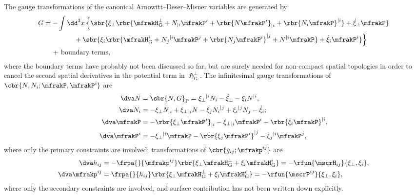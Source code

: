 \documentclass[a4paper,11pt]{article}
\begin{document}
The gauge transformations of the canonical Arnowitt--Deser--Misner variables are 
generated by \cite{Castellani1982} 
\begin{align}
G &= -\int\dd^3 x\,\Big\{ \sbr{
	\xi_\perp \rbr{
		\mfrakH_\text{G}^\perp + N_{|i} \mfrakP^i + \rbr{N\mfrakP^i}_{|i} + 
			\rbr{N_i \mfrakP}^{|i}} +
	\dot{\xi}_\perp \mfrakP}
\nonumber \\
&\qquad\qquad\ \,+ \sbr{
	\xi_i \rbr{
		\mfrakH_\text{G}^i + N_j{}^{|i} \mfrakP^j + \rbr{N_j \mfrakP^i}^{|j} + 
N^{|i} 
\mfrakP} +
	\dot{\xi}_i \mfrakP^i} \Big\}
\nonumber \\
&\quad\,
+\,\text{boundary terms},
\end{align}
where the boundary terms have probably not been discussed so far, but are 
surely needed for non-compact spatial topologies in order to cancel the second 
spatial derivatives in the potential term in $\mfrakH_\text{G}^\perp$. The 
infinitesimal 
gauge transformations of $\cbr{N, N_i; \mfrakP, \mfrakP^i}$ are 
\cite{Kiriushcheva2008}
\begin{align}
\dva N &= \sbr{N, G}_\text{P} = 
\xi_\perp{}^{|i} N_i - \dot{\xi}_\perp - \xi_i N^{|i},
\label{eq:gauge-Np} \\
\dva N_i &= %
- \xi_\perp N_{|i} + \xi_\perp{}_{|i} N
- \xi_j N_{i}{}^{|j} + \xi_i{}^{|j} N_j - \dot{\xi}_i;
\label{eq:gauge-Ni} \\
\dva \mfrakP &= -\rbr{\xi_\perp \mfrakP^i}_{|i} - \xi_\perp{}_{|i} \mfrakP^i
- \rbr{\xi_i \mfrakP}^{|i},
\label{eq:gauge-Pp} \\
\dva \mfrakP^i &= -\xi_\perp{}^{|i} \mfrakP
- \rbr{\xi_j \mfrakP^i}^{|j} - \xi_j{}^{|i}\mfrakP^j,
\label{eq:gauge-Pi}
\end{align}
where only the primary constraints are involved; transformations of 
$\cbr{g_{ij}; \mfrakp^{ij}}$ are
\begin{align}
\dva h_{ij} &= -\frpa{}{\mfrakp^{ij}}
\rbr{\xi_\perp \mfrakH_\text{G}^\perp + \xi_i \mfrakH_\text{G}^i} =
-\rfun{\mscrH_{ij}}{\xi_\perp, \xi_i},
\label{eq:gauge-hij} \\
\dva \mfrakp^{ij} &= \frpa{}{h_{ij}}
\rbr{\xi_\perp \mfrakH_\text{G}^\perp + \xi_i \mfrakH_\text{G}^i} =
-\rfun{\mscrP^{ij}}{\xi_\perp, \xi_i},
\label{eq:gauge-pij}
\end{align}
where only the secondary constraints are involved, and surface contribution 
has not been written down explicitly. 
\end{document}
